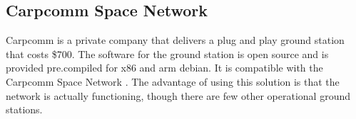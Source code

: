 \subsection{Carpcomm Space Network}
Carpcomm is a private company that delivers a plug and play ground station \cite{carpcomm-gs1} that costs \$700. The software for the ground station is open source and is provided pre.compiled for x86 and arm debian.
It is compatible with the Carpcomm Space Network \cite{carpcomm-sn}. 
The advantage of using this solution is that the network is actually functioning, though there are few other operational ground stations.
